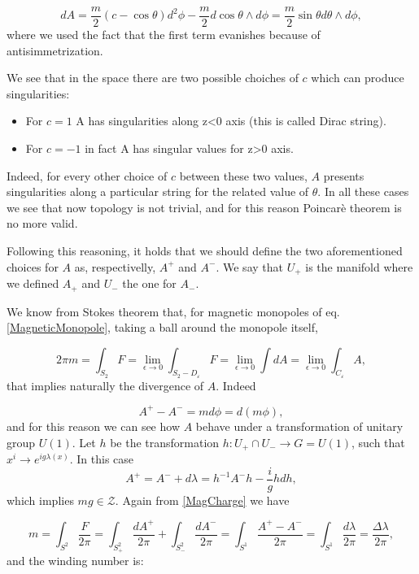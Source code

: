 \documentclass[main.tex]{subfiles}
\begin{document}
\begin{equation}
dA=\frac{m}{2}\left(c-\cos\theta\right)d^2\phi-\frac{m}{2}d\cos\theta\wedge d \phi=\frac{m}{2}\sin\theta d\theta\wedge d \phi,
\end{equation}
where we used the fact that the first term evanishes because of antisimmetrization.

We see that in the space there are two possible choiches of $c$ which can produce singularities:

\begin{itemize}
\item For $c=1$ A has singularities along z<0 axis (this is called Dirac string).
\item For $c=-1$ in fact A has singular values for z>0 axis.
\end{itemize}
Indeed, for every other choice of $c$ between these two values, $A$ presents singularities along a particular string for the related value of $\theta$. In all these cases we see that now topology is not trivial, and for this reason Poincarè theorem is no more valid.


Following this reasoning, it holds that we should define the two aforementioned choices for $A$ as, respectivelly, $A^+$ and $A^-$. We say that $U_+$ is the manifold where we defined $A_+$ and $U_-$ the one for $A_-$.

We know from Stokes theorem that, for magnetic monopoles of eq. \eqref{MagneticMonopole}, taking a ball around the monopole itself,

\begin{equation}\label{MagCharge}
2\pi m=\int_{S_2} F=\lim_{\epsilon\to 0}\int_{S_2-D_{\varepsilon}}F=\lim_{\epsilon\to 0}\int dA=\lim_{\epsilon\to 0}\int_{C_{\varepsilon}} A,
\end{equation}
that implies naturally the divergence of $A$. Indeed

\begin{equation}
A^+-A^-=md\phi=d(m\phi),
\end{equation}
and for this reason we can see how $A$ behave under a transformation of unitary group $U(1)$.
Let $h$ be the transformation $h:U_+\cap U_- \to G=U(1)$, such that $x^i\to e^{ig\lambda(x)}$. In this case
\begin{equation}
A^+=A^-+d\lambda=h^{-1}A^-h-\frac{i}{g}h dh,
\end{equation}
which implies $mg\in \mathcal{Z}$. Again from \eqref{MagCharge} we have

\begin{equation}
m=\int_{S^2}\frac{F}{2\pi}=\int_{S^2_+}\frac{dA^+}{2\pi}+\int_{S^2_-}\frac{dA^-}{2\pi}=\int_{S^1}\frac{A^+-A^-}{2\pi}=\int_{S^1}\frac{d\lambda}{2\pi}=\frac{\Delta\lambda}{2\pi},
\end{equation}
and the winding number is:
\end{document}

